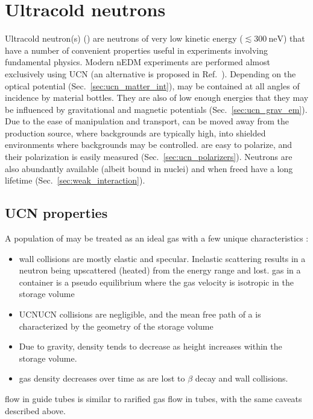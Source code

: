 
\chapter{Ultracold neutrons}\label{chap:UCN}


Ultracold neutron(s) (\ucn) are neutrons of very low kinetic energy ($\lesssim \qty{300}{\nano\eV}$) that have a number of convenient properties useful in experiments involving fundamental physics. Modern nEDM experiments are performed almost exclusively using UCN \cite{BAK06, SER15, ABE20} (an alternative is proposed in Ref.~\cite{PIE13}). Depending on the optical potential (Sec.~\ref{sec:ucn_matter_int}), \ucn may be contained at all angles of incidence by material bottles. They are also of low enough energies that they may be influenced by gravitational and magnetic potentials (Sec.~\ref{sec:ucn_grav_em}). Due to the ease of manipulation and transport, \ucn can be moved away from the production source, where backgrounds are typically high, into shielded environments where backgrounds may be controlled. \ucn are easy to polarize, and their polarization is easily measured (Sec.~\ref{sec:ucn_polarizers}). Neutrons are also abundantly available (albeit bound in nuclei) and when freed have a long lifetime (Sec.~\ref{sec:weak_interaction}).


\section{UCN properties}


A population of \ucn may be treated as an ideal gas with a few unique characteristics \cite{golubUCN}: 
%
\begin{itemize}
    \item \ucn wall collisions are mostly elastic and specular. Inelastic scattering results in a neutron being upscattered (heated) from the \ucn energy range and lost. \ucn gas in a container is a pseudo equilibrium where the gas velocity is isotropic in the storage volume
    \item UCN\textendash UCN collisions are negligible, and the mean free path of a \ucn is characterized by the geometry of the storage volume
    \item Due to gravity, \ucn density tends to decrease as height increases within the storage volume.
    \item \ucn gas density decreases over time as \ucn are lost to $\beta$ decay and wall collisions.
\end{itemize}
%
\ucn flow in guide tubes is similar to rarified gas flow in tubes, with the same caveats described above.


